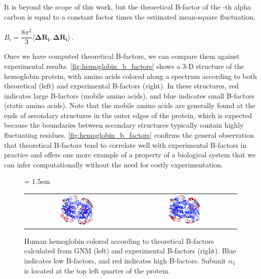 It is beyond the scope of this work, but the theoretical B-factor of the -th alpha carbon is equal to a constant factor times the estimated mean-square fluctuation,

\begin{center}
$ B_i = \dfrac{8 \pi^2}{3} \langle \mathbf{\Delta R_i}, \mathbf{\Delta R_i} \rangle$\,.
\end{center}

Once we have computed theoretical B-factors, we can compare them against experimental results. \autoref{fig:hemoglobin_b_factors} shows a 3-D structure of the hemoglobin protein, with amino acids colored along a spectrum according to both theoretical (left) and experimental B-factors (right). In these structures, red indicates large B-factors (mobile amino acids), and blue indicates small B-factors (static amino acids). Note that the mobile amino acids are generally found at the ends of secondary structures in the outer edges of the protein, which is expected because the boundaries between secondary structures typically contain highly fluctuating residues. \autoref{fig:hemoglobin_b_factors} confirms the general observation that theoretical B-factors tend to correlate well with experimental B-factors in practice and offers one more example of a property of a biological system that we can infer computationally without the need for costly experimentation.\\

\begin{figure}[h]
	\centering
	\tabcolsep = 1.5em
	\mySfFamily
	\begin{tabular}{c c}
		\includegraphics[width = 0.35\textwidth]{../images_CMYK/hemoglobin_b-factors_theoretical} & \includegraphics[width = 0.35\textwidth]{../images_CMYK/hemoglobin_b-factors_experimental}
	\end{tabular}
	\caption{Human hemoglobin colored according to theoretical B-factors calculated from GNM (left) and experimental B-factors (right). Blue indicates low B-factors, and red indicates high B-factors. Subunit $\text{α}_\text{1}$ is located at the top left quarter of the protein.}
	\label{fig:hemoglobin_b_factors}
\end{figure}

